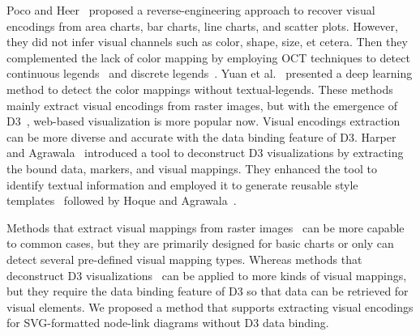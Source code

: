 Poco and Heer~\cite{DBLP:journals/cgf/PocoH17} proposed a reverse-engineering approach to recover visual encodings from area charts, bar charts, line charts, and scatter plots. 
However, they did not infer visual channels such as color, shape, size, et cetera.
Then they complemented the lack of color mapping by employing OCT techniques to detect continuous legends~\cite{DBLP:journals/tvcg/PocoMH18} and discrete legends~\cite{DBLP:conf/sibgrapi/MayhuaNHP18}.
Yuan et al.~\cite{DBLP:journals/corr/abs-2103-00741} presented a deep learning method to detect the color mappings without textual-legends.
These methods mainly extract visual encodings from raster images, but with the emergence of D3~\cite{DBLP:journals/tvcg/BostockOH11}, web-based visualization is more popular now.
Visual encodings extraction can be more diverse and accurate with the data binding feature of D3.
Harper and Agrawala~\cite{DBLP:conf/uist/HarperA14} introduced a tool to deconstruct D3 visualizations by extracting the bound data, markers, and visual mappings. 
They enhanced the tool to identify textual information and employed it to generate reusable style templates~\cite{DBLP:journals/tvcg/HarperA18} followed by Hoque and Agrawala~\cite{DBLP:journals/tvcg/HoqueA20}. %

Methods that extract visual mappings from raster images~\cite{DBLP:journals/cgf/PocoH17, DBLP:journals/tvcg/PocoMH18, DBLP:conf/sibgrapi/MayhuaNHP18, DBLP:journals/corr/abs-2103-00741} can be more capable to common cases, but they are primarily designed for basic charts or only can detect several pre-defined visual mapping types.
Whereas methods that deconstruct D3 visualizations~\cite{DBLP:conf/uist/HarperA14, DBLP:journals/tvcg/HarperA18, DBLP:journals/tvcg/HoqueA20} can be applied to more kinds of visual mappings, but they require the data binding feature of D3 so that data can be retrieved for visual elements. We proposed a method that supports extracting visual encodings for SVG-formatted node-link diagrams without D3 data binding.

